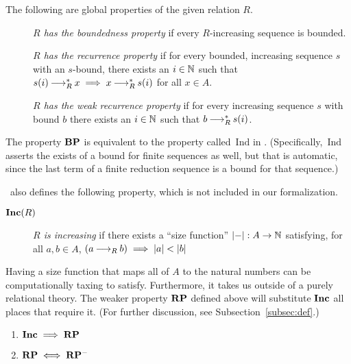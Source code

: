 \begin{definition} \label{def:rp}
  The following are global properties of the given relation $R$.  \hfill
    \begin{description}
        \item[] \emph{$R$ has the boundedness property} if every $R$-increasing sequence is bounded.
        \item[] \emph{$R$ has the recurrence property} if for every bounded, increasing sequence $s$ with an $s$-bound, there exists an $i \in \mathbb{N}$ such that
        $s (i) \mathbin{\longrightarrow_R^*} x \implies x \mathbin{\longrightarrow_R^*} s (i)$ for all $x\in A$.
        \item[] \emph{$R$ has the weak recurrence property} if for every increasing sequence $s$ with bound $b$ there exists an $i \in \mathbb{N}$ such that $b \mathbin{\longrightarrow_R^*} s (i)$.
    \end{description}
\end{definition}

The property $\mathbf{BP}$ is equivalent to the property called $\mathrm{\,Ind}$ in \terese. (Specifically, $\mathrm{\,Ind}$ asserts the exists of a bound for finite sequences as well, but that is automatic, since the last term of a finite reduction sequence is a bound for that sequence.) 

\terese $\,$ also defines the following property, which is not included in our formalization.

\begin{definition} \hfill
    \begin{description}
        \item[$\mathbf{Inc}(R)$] \emph{$R$ is increasing} if there exists a ``size function'' $|{-}| : A \to \mathbb{N}$ satisfying, for all $a, b \in A$,
        $(a \mathbin{\longrightarrow_R} b) \implies |a| < |b|$
    \end{description}
\end{definition}

Having a size function that maps all of $A$ to the natural numbers can be computationally taxing to satisfy.
Furthermore, it takes us outside of a purely relational theory. The weaker property $\mathbf{RP}$ defined above will substitute $\mathbf{Inc}$ all places that require it. (For further discussion, see Subsection~\ref{subsec:def}.)

\begin{proposition}\hfill
    \begin{enumerate}
        \item $\mathbf{Inc} \implies \mathbf{RP}$
        \item $\mathbf{RP} \iff \mathbf{RP^{-}}$
    \end{enumerate}
\end{proposition}

